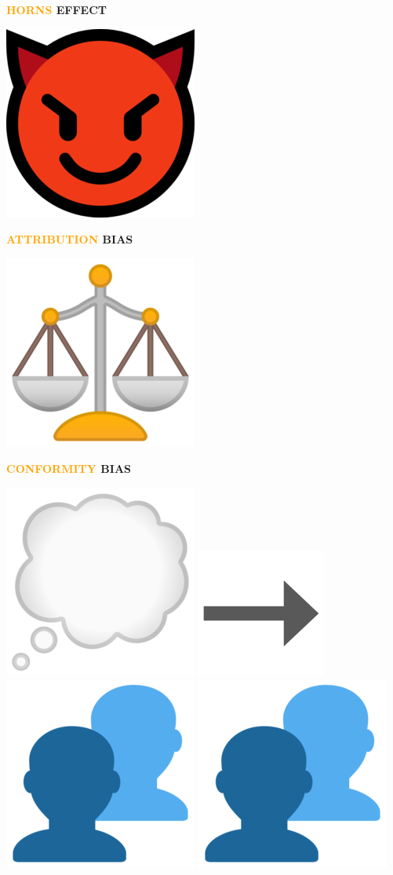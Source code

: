 \documentclass{beamer}
\begin{document}
\begin{frame}
    \begin{center}
        \textbf{\Large{\textcolor{orange}{HORNS} EFFECT}}
        \vspace{.5cm}

        \includegraphics[width=.1\textwidth]{static/horn.png}
    \end{center}
\end{frame}

\begin{frame}
    \begin{center}
        \textbf{\Large{\textcolor{orange}{ATTRIBUTION} BIAS}}
        \vspace{.5cm}

        \includegraphics[width=.1\textwidth]{static/scale.png}
    \end{center}
\end{frame}

\begin{frame}
    \begin{center}
        \textbf{\Large{\textcolor{orange}{CONFORMITY} BIAS}}
        \vspace{.5cm}

    \includegraphics[width=.1\textwidth]{static/thought-balloon.png}
    \includegraphics[width=.1\textwidth]{static/arrow.png}
    \includegraphics[width=.1\textwidth]{static/people.png}
    \includegraphics[width=.1\textwidth]{static/people.png}
    \end{center}
\end{frame}
\end{document}
